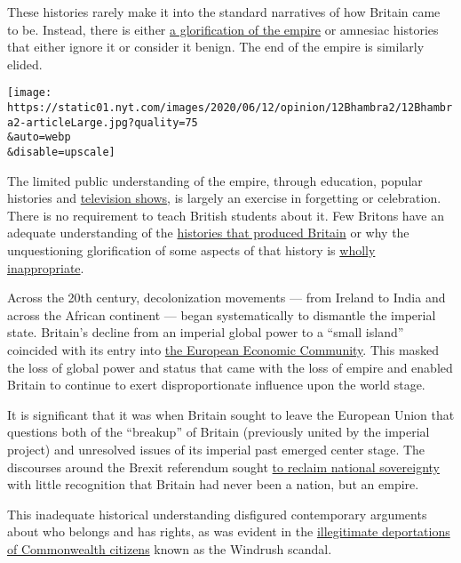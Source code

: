 These histories rarely make it into the standard narratives of how
Britain came to be. Instead, there is either
\href{https://www.independent.co.uk/news/uk/politics/british-people-are-proud-of-colonialism-and-the-british-empire-poll-finds-a6821206.html}{a
glorification of the empire} or amnesiac histories that either ignore it
or consider it benign. The end of the empire is similarly elided.

\texttt{[image: https://static01.nyt.com/images/2020/06/12/opinion/12Bhambra2/12Bhambra2-articleLarge.jpg?quality=75\\\&auto=webp\\\&disable=upscale]}

The limited public understanding of the empire, through education,
popular histories and
\href{https://www.radiotimes.com/travel/2018-04-03/michael-portillo-rides-the-rails-in-india-for-once-i-felt-quite-understated-in-my-attire/}{television
shows}, is largely an exercise in forgetting or celebration. There is no
requirement to teach British students about it. Few Britons have an
adequate understanding of the
\href{https://www.nytimes.com/2017/08/02/opinion/dunkirk-indians-world-war.html}{histories
that produced Britain} or why the unquestioning glorification of some
aspects of that history is
\href{https://www.independent.co.uk/voices/poll-shows-brits-are-proud-of-colonialism-clearly-they-havent-heard-of-these-colonial-crimes-a6823151.html}{wholly
inappropriate}.

Across the 20th century, decolonization movements --- from Ireland to
India and across the African continent --- began systematically to
dismantle the imperial state. Britain's decline from an imperial global
power to a ``small island'' coincided with its entry into
\href{https://ukandeu.ac.uk/fact-figures/when-did-britain-decide-to-join-the-european-union/}{the
European Economic Community}. This masked the loss of global power and
status that came with the loss of empire and enabled Britain to continue
to exert disproportionate influence upon the world stage.

It is significant that it was when Britain sought to leave the European
Union that questions both of the ``breakup'' of Britain (previously
united by the imperial project) and unresolved issues of its imperial
past emerged center stage. The discourses around the Brexit referendum
sought
\href{https://discoversociety.org/2016/07/05/viewpoint-brexit-class-and-british-national-identity/}{to
reclaim national sovereignty} with little recognition that Britain had
never been a nation, but an empire.

This inadequate historical understanding disfigured contemporary
arguments about who belongs and has rights, as was evident in the
\href{https://www.nytimes.com/2018/04/24/world/europe/britain-windrush-immigrants.html}{illegitimate
deportations of Commonwealth citizens} known as the Windrush scandal.

